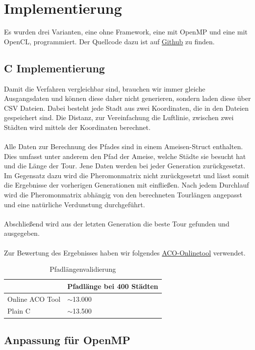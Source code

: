 \section{Implementierung}
Es wurden drei Varianten, eine ohne Framework, eine mit OpenMP und eine mit OpenCL, programmiert.
Der Quellcode dazu ist auf \href{https://github.com/burk3rt/HPC-Projekt}{Github} zu finden.
\subsection{C Implementierung}

Damit die Verfahren vergleichbar sind, brauchen wir immer gleiche Ausgangsdaten und können diese daher nicht generieren, sondern laden diese über CSV Dateien.
Dabei besteht jede Stadt aus zwei Koordinaten, die in den Dateien gespeichert sind.
Die Distanz, zur Vereinfachung die Luftlinie, zwischen zwei Städten wird mittels der Koordinaten berechnet.
\\\\
Alle Daten zur Berechnung des Pfades sind in einem Ameisen-Struct enthalten.
Dies umfasst unter anderem den Pfad der Ameise, welche Städte sie besucht hat und die Länge der Tour.
Jene Daten werden bei jeder Generation zurückgesetzt.
Im Gegensatz dazu wird die Pheromonmatrix nicht zurückgesetzt und lässt somit die Ergebnisse der vorherigen Generationen mit einfließen.
Nach jedem Durchlauf wird die Pheromonmatrix abhängig von den berechneten Tourlängen angepasst und eine natürliche Verdunstung durchgeführt.
\\\\
Abschließend wird aus der letzten Generation die beste Tour gefunden und ausgegeben.
\\\\
Zur Bewertung des Ergebnisses haben wir folgendes \href{https://poolik.github.io/visual-aco/}{ACO-Onlinetool} verwendet.
\begin{table}[h]
    \centering
    \begin{tabular}{|l|l|}
    \hline
                    & Pfadlänge bei 400 Städten     \\ \hline
    Online ACO Tool & $\sim$13.000                  \\ \hline
    Plain C         & $\sim$13.500                  \\ \hline
    \end{tabular}
    \caption{\label{demo-table}Pfadlängenvalidierung}
\end{table}


\subsection{Anpassung für OpenMP}

